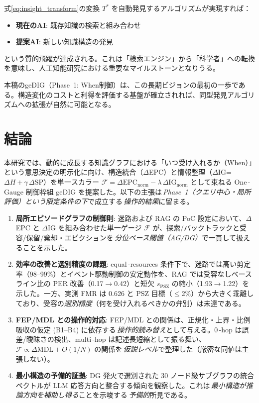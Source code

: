 \documentclass[ja=standard,xelatex]{bxjsarticle}
\newcommand{\F}{\mathcal{F}}
\newcommand{\gednorm}{\Delta\mathrm{EPC}_{\mathrm{norm}}}
\newcommand{\ignorm}{\Delta\mathrm{IG}_{\mathrm{norm}}}
\begin{document}
式\eqref{eq:insight_transform}の変換 $T^*$ を自動発見するアルゴリズムが実現すれば：
\begin{itemize}[leftmargin=1.8em]
  \item \textbf{現在のAI}: 既存知識の検索と組み合わせ
  \item \textbf{提案AI}: 新しい知識構造の発見
\end{itemize}
という質的飛躍が達成される。これは「検索エンジン」から「科学者」への転換を意味し、人工知能研究における重要なマイルストーンとなりうる。

本稿のgeDIG（Phase~1: When制御）は、この長期ビジョンの最初の一歩である。構造変化のコストと利得を評価する基盤が確立されれば、同型発見アルゴリズムへの拡張が自然に可能となる。

\section{結論}

本研究では、動的に成長する知識グラフにおける「いつ受け入れるか（When）」という意思決定の明示化に向け、構造統合（$\Delta$EPC）と情報整理（$\Delta$IG=$\Delta H{+}\gamma\,\Delta\mathrm{SP}$）を単一スカラー $\F=\gednorm-\lambda\,\ignorm$ として束ねる One\,\mbox{-}Gauge 制御枠組 geDIG を提案した。以下の主張は\,\emph{Phase~1（クエリ中心・局所評価）という限定条件の下}で成立する\,\emph{操作的結果}に留まる。

\begin{enumerate}[leftmargin=1.6em]
  \item \textbf{局所エピソードグラフの制御則}: 迷路および RAG の PoC 設定において、$\Delta$EPC と $\Delta$IG を組み合わせた単一ゲージ $\F$ が、探索/バックトラックと受容/保留/棄却・エビクションを\,\emph{分位ベース閾値（AG/DG）}で一貫して扱えることを示した。
  \item \textbf{効率の改善と選別精度の課題}: equal\,\mbox{-}resources 条件下で、迷路では高い剪定率（98--99\%）とイベント駆動制御の安定動作を、RAG では受容なしベースライン比の PER 改善（0.17$\to$0.42）と短欠 $s_{\mathrm{PSZ}}$ の縮小（1.93$\to$1.22）を示した。一方、実測 FMR は 0.626 と PSZ 目標（$\le$2\%）から大きく乖離しており、受容の\emph{選別精度}（何を受け入れるべきかの弁別）は未達である。
  \item \textbf{FEP/MDL との操作的対応}: FEP/MDL との関係は、正規化・上界・比例吸収の仮定 (B1–B4) に依存する\,\emph{操作的読み替え}として与える。0\,\mbox{-}hop は誤差/曖昧さの検出、multi\,\mbox{-}hop は記述⻑短縮として振る舞い、$\F\propto\Delta\mathrm{MDL}{+}O(1/N)$ の関係を\,\emph{仮説レベル}で整理した（厳密な同値は主張しない）。
  \item \textbf{最小構造の予備的証拠}: DG 発火で選別された 30 ノード級サブグラフの統合ベクトルが LLM 応答方向と整合する傾向を観察した。これは\,\emph{最小構造が推論方向を補助し得る}ことを示唆する\,\emph{予備的}所見である。
\end{enumerate}
\end{document}
